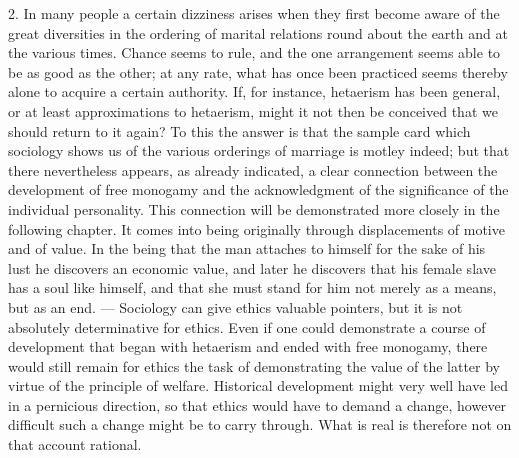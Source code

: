 \documentclass[12pt,a4paper,openany]{book}
\newcommand{\opage}[1]{\marginnote{\footnotesize\textit{[#1]}}}
\begin{document}
2. In many people a certain dizziness arises when they first become aware of the great diversities in the ordering of
marital relations round about the earth and at the various times. Chance seems to rule, and the one arrangement seems
able to be as good as the other; at any rate, what has once been practiced seems thereby alone to acquire a certain
authority. If, for instance, hetaerism has been general, or at least approximations to hetaerism, might it not then be
conceived that we should return to it again? To this the answer is that the sample card which sociology shows us of the
various orderings of marriage is motley indeed; but that there nevertheless appears, as already indicated, a clear
connection between the development of free monogamy and the acknowledgment of the significance of the individual
personality. This connection will be demonstrated more closely in the following chapter. It comes into being originally
through displacements of motive and of value. In the being that the man attaches to himself for the sake of his lust he
discovers an economic value, and later he discovers that his female slave has a soul like himself, and that she must
stand for him not merely as a means, but as an end. --- Sociology can give ethics valuable pointers, but it is not
absolutely
\opage{285}determinative for ethics. Even if one could demonstrate a course of development that began with hetaerism and
ended with free monogamy, there would still remain for ethics the task of demonstrating the value of the latter by
virtue of the principle of welfare. Historical development might very well have led in a pernicious direction, so that
ethics would have to demand a change, however difficult such a change might be to carry through. What is real is
therefore not on that account rational. %
\end{document}

